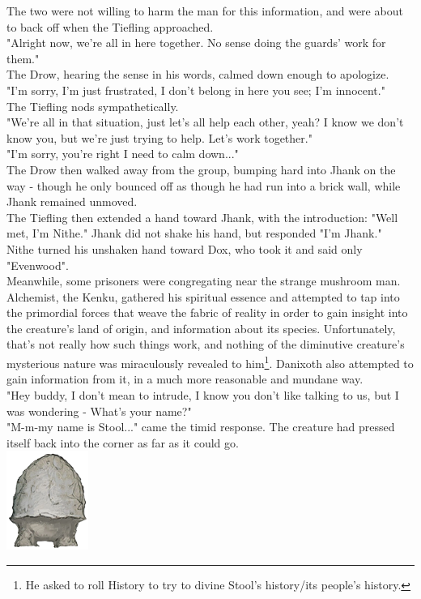 \documentclass[letterpaper,10pt,twoside,twocolumn,openany]{book}
\begin{document}
The two were not willing to harm the man for this information, and were about to back off when the Tiefling approached.\\
"Alright now, we're all in here together. No sense doing the guards' work for them."\\
The Drow, hearing the sense in his words, calmed down enough to apologize.\\
"I'm sorry, I'm just frustrated, I don't belong in here you see; I'm innocent."\\
The Tiefling nods sympathetically.\\
"We're all in that situation, just let's all help each other, yeah? I know we don't know you, but we're just trying to help. Let's work together."\\
"I'm sorry, you're right I need to calm down..."\\
The Drow then walked away from the group, bumping hard into Jhank on the way - though he only bounced off as though he had run into a brick wall, while Jhank remained unmoved.\\
The Tiefling then extended a hand toward Jhank, with the introduction: "Well met, I'm Nithe." Jhank did not shake his hand, but responded "I'm Jhank."\\
Nithe turned his unshaken hand toward Dox, who took it and said only "Evenwood".\\

Meanwhile, some prisoners were congregating near the strange mushroom man. Alchemist, the Kenku, gathered his spiritual essence and attempted to tap into the primordial forces that weave the fabric of reality in order to gain insight into the creature's land of origin, and information about its species. Unfortunately, that's not really how such things work, and nothing of the diminutive creature's mysterious nature was miraculously revealed to him\footnote{He asked to roll History to try to divine Stool's history/its people's history.}. Danixoth also attempted to gain information from it, in a much more reasonable and mundane way.\\
"Hey buddy, I don't mean to intrude, I know you don't like talking to us, but I was wondering - What's your name?"\\
"M-m-my name is Stool..." came the timid response. The creature had pressed itself back into the corner as far as it could go.\\
{\centering
	\includegraphics[width=0.2\textwidth]{img/dist/stool.png}
}
\end{document}
